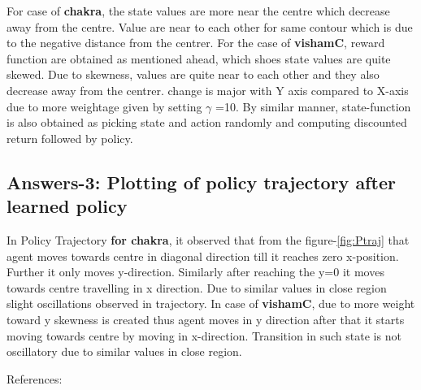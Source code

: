 \documentclass[preprint,12pt]{elsarticle}
\begin{document}
For case of \textbf{chakra}, the state values are more near the centre which decrease away from the centre. Value are near to each other for same contour which is due to the negative distance from the centrer. For the case of \textbf{vishamC}, reward function are obtained as mentioned ahead, which shoes state values are quite skewed. Due to skewness, values are quite near to each other and they also decrease away from the centrer. change is major with Y axis compared to X-axis due to more weightage given by setting $\gamma$ =10. By similar manner, state-function is also obtained as picking state and action randomly and computing discounted return followed by policy.


	
 \subsection{Answers-3: Plotting of policy trajectory after learned policy}


	In Policy Trajectory \textbf{for chakra}, it observed that from the figure-\ref{fig:Ptraj} that agent moves towards centre in diagonal direction till it reaches zero x-position. Further it only moves y-direction. Similarly after reaching the y=0 it moves towards centre travelling in x direction. Due to similar values in close region slight oscillations observed in trajectory. In case of \textbf{vishamC}, due to more weight toward y skewness is created thus agent moves in y direction after that it starts moving towards centre by moving in x-direction. Transition in such state is not oscillatory due to similar values in close region.
	
	\newpage
	
	References:
	\\
	
	
	
	
						
	
	
	
	
	
\end{document}
